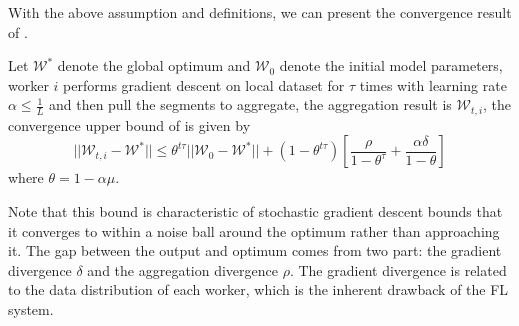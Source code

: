 With the above assumption and definitions, we can present the convergence result of \sys. 

\begin{theorem}
\label{trm:converge}
    Let $\mathcal{W}^*$ denote the global optimum and $\mathcal{W}_0$ denote the initial model parameters, worker $i$ performs gradient descent on local dataset for $\tau$ times with learning rate $\alpha \leq \frac{1}{L}$ and then pull the segments to aggregate, the aggregation result is $\mathcal{W}_{t,i}$, the convergence upper bound of \sys is given by
    \begin{equation}
            ||\mathcal{W}_{t,i}-\mathcal{W}^*|| \leq \theta^{t\tau} ||\mathcal{W}_{0}-\mathcal{W}^*|| + (1-\theta^{t\tau})[\frac{\rho}{1-\theta^\tau} + \frac{\alpha \delta}{1-\theta}]
    \end{equation}
    where $\theta = 1-\alpha \mu$.
\end{theorem}
\newenvironment{ProofSketch}{%
  \renewcommand{\proofname}{\bf Proof Sketch}\proof}{\endproof}
  


Note that this bound is characteristic of stochastic gradient descent bounds that it converges to within a noise ball around the optimum rather than approaching it. The gap between the output and optimum comes from two part: the gradient divergence $\delta$ and the aggregation divergence $\rho$. The gradient divergence is related to the data distribution of each worker, which is the inherent drawback of the FL system.

